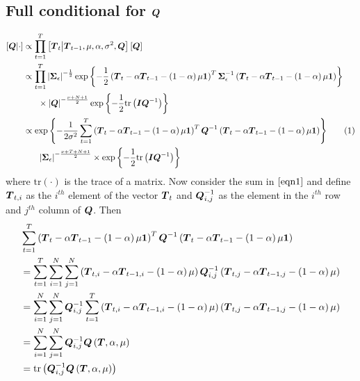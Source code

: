 \documentclass{article}\usepackage[]{graphicx}\usepackage[]{color}
\def\bm#1{\mbox{\boldmath $#1$}}
\newcommand\numberthis{\addtocounter{equation}{1}\tag{\theequation}}
\begin{document}
\subsection{Full conditional for $\bm{Q}$}
%
\begin{align*}
%
\left[ \bm{Q} \middle| \cdot \right] & \propto \prod_{t = 1}^T \left[ \bm{T}_t \middle| \bm{T}_{t - 1}, \mu, \alpha, \sigma^2, \bm{Q} \right] \left[ \bm{Q} \right]\\
%
& \propto \prod_{t = 1}^T \left| \bm{\Sigma}_\epsilon \right|^{ - \frac{1} {2} } \exp{ \left\{ - \frac{1} {2} \left( \bm{T}_t  - \alpha \bm{T}_{t - 1} - \left( 1 - \alpha \right) \mu \bm{1} \right)^T \bm{\Sigma}_\epsilon^{ - 1} \left( \bm{T}_t  - \alpha \bm{T}_{t - 1} - \left( 1 - \alpha \right) \mu \bm{1} \right) \right\} }\\
& \hspace{6mm} \times \left| \bm{Q} \right|^{ - \frac{\nu + N + 1} {2}} \exp{ \left\{ - \frac{1} {2} \mbox{tr}\left( \bm{I} \bm{Q}^{ - 1} \right) \right\} }\\
%
& \propto \exp{ \left\{ - \frac{1} {2 \sigma^2} \sum_{t = 1}^T \left( \bm{T}_t  - \alpha \bm{T}_{t - 1} - \left( 1 - \alpha \right) \mu \bm{1} \right)^T \bm{Q}^{ - 1} \left( \bm{T}_t  - \alpha \bm{T}_{t - 1} - \left( 1 - \alpha \right) \mu \bm{1} \right) \right\} } \numberthis \label{eqn1}\\
& \hspace{6mm} \left| \bm{\Sigma}_\epsilon \right|^{ - \frac{\nu + T + N + 1} {2} } \times \exp{ \left\{ - \frac{1} {2} \mbox{tr}\left( \bm{I} \bm{Q}^{ - 1} \right) \right\} }\\
%
\end{align*}
%
where $\mbox{tr} \left( \cdot \right)$ is the trace of a matrix. Now consider the sum in $\eqref{eqn1}$ and define $\bm{T}_{t, i}$ as the $i^{th}$ element of the vector $\bm{T}_t$ and $\bm{Q}^{ - 1}_{i, j}$ as the element in the $i^{th}$ row and $j^{th}$ column of $\bm{Q}$. Then
%
\begin{align*}
%
& \sum_{t = 1}^T \left( \bm{T}_t  - \alpha \bm{T}_{t - 1} - \left( 1 - \alpha \right) \mu \bm{1} \right)^T \bm{Q}^{ - 1} \left( \bm{T}_t  - \alpha \bm{T}_{t - 1} - \left( 1 - \alpha \right) \mu \bm{1} \right)\\
%
& = \sum_{t = 1}^T \sum_{i = 1}^N \sum_{j = 1}^N \left( \bm{T}_{t, i}  - \alpha \bm{T}_{t - 1, i} - \left( 1 - \alpha \right) \mu \right) \bm{Q}^{ - 1}_{i, j} \left( \bm{T}_{t, j}  - \alpha \bm{T}_{t - 1, j} - \left( 1 - \alpha \right) \mu \right)\\
%
& = \sum_{i = 1}^N \sum_{j = 1}^N \bm{Q}^{ - 1}_{i, j} \sum_{t = 1}^T \left( \bm{T}_{t, i}  - \alpha \bm{T}_{t - 1, i} - \left( 1 - \alpha \right) \mu \right) \left( \bm{T}_{t, j}  - \alpha \bm{T}_{t - 1, j} - \left( 1 - \alpha \right) \mu \right)\\
%
& = \sum_{i = 1}^N \sum_{j = 1}^N \bm{Q}^{ - 1}_{i, j} \bm{Q} \left(\bm{T}, \alpha, \mu \right) \\
%
& = \mbox{tr} \left( \bm{Q}^{ - 1}_{i, j} \bm{Q} \left(\bm{T}, \alpha, \mu \right) \right) \\
%
\end{align*}
\end{document}
